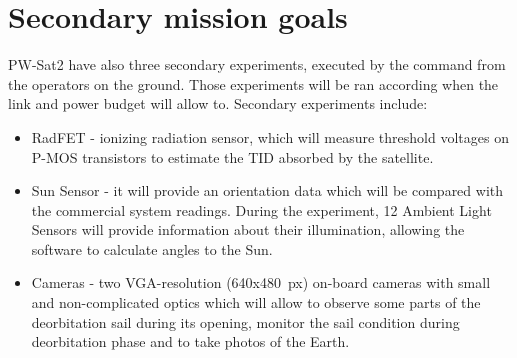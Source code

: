 \section{Secondary mission goals}
PW-Sat2 have also three secondary experiments, executed by the command from the operators on the ground. Those experiments will be ran according when the link and power budget will allow to. Secondary experiments include:
\begin{itemize}
    \item RadFET - ionizing radiation sensor, which will measure threshold voltages on P-MOS transistors to estimate the TID absorbed by the satellite.
    \item Sun Sensor -  it will provide an orientation data which will be compared with the commercial system readings. During the experiment, \si{12} Ambient Light Sensors will provide information about their illumination, allowing the software to calculate angles to the Sun.
    \item Cameras - two VGA-resolution (\si{640}x\si{480}~px) on-board cameras with small and non-complicated optics which will allow to observe some parts of the deorbitation sail during its opening, monitor the sail condition during deorbitation phase and to take photos of the Earth.
\end{itemize}


